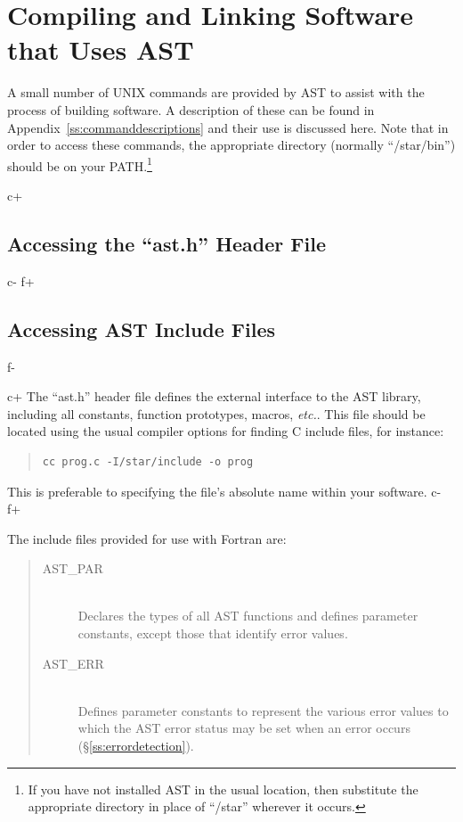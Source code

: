 \documentclass[twoside,11pt]{article}
\newcommand{\appref}[1]{Appendix~\ref{#1}}
\newcommand{\secref}[1]{\S\ref{#1}}
\newcommand{\appref}[1]{\ref{#1}}
\newcommand{\secref}[1]{\ref{#1}}
\begin{document}
\cleardoublepage
\section{Compiling and Linking Software that Uses AST}

A small number of UNIX commands are provided by AST to assist with the
process of building software. A description of these can be found in
\appref{ss:commanddescriptions} and their use is discussed here.  Note
that in order to access these commands, the appropriate directory
(normally ``/star/bin'') should be on your PATH.\footnote{If you have
not installed AST in the usual location, then substitute the
appropriate directory in place of ``/star'' wherever it occurs.}

c+
\subsection{\label{ss:accessingheaderfile}Accessing the ``ast.h'' Header File}
c-
f+
\subsection{\label{ss:accessingheaderfile}Accessing AST Include Files}
f-

c+
The ``ast.h'' header file defines the external interface to the AST library, 
including all constants, function prototypes, macros, {\em{etc.}}. This file
should be located using the usual compiler options for finding C
include files, for instance:

\begin{quote}
\small
\begin{verbatim}
cc prog.c -I/star/include -o prog
\end{verbatim}
\normalsize
\end{quote}

This is preferable to specifying the file's absolute name within your
software.
c-
f+

The include files provided for use with Fortran are:

\begin{quote}
\begin{description}
\item[AST\_PAR]\mbox{}\\
Declares the types of all AST functions and defines parameter
constants, except those that identify error values.

\item[AST\_ERR]\mbox{}\\
Defines parameter constants to represent the various error values to
which the AST error status may be set when an error occurs
(\secref{ss:errordetection}).
\end{description}
\end{quote}
\end{document}
